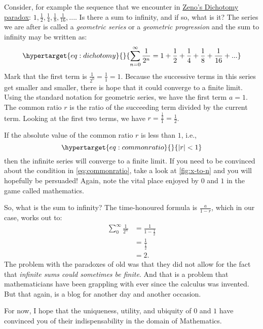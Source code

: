 \documentclass[
  a4paper,
]{article}
\begin{document}
Consider, for example the sequence that we encounter in
\href{https://en.wikipedia.org/wiki/Zeno\%27s_paradoxes}{Zeno's
Dichotomy paradox}:
\(1, \frac{1}{2}, \frac{1}{4}, \frac{1}{8}, \frac{1}{16}, ...\). Is
there a sum to infinity, and if so, what is it? The series we are after
is called a \emph{geometric series} or a \emph{geometric progression}
and the sum to infinity may be written as:
\begin{equation}\protect\hypertarget{eq:dichotomy}{}{
\sum_{n = 0}^{\infty}\frac{1}{2^{n}} = 1 + \frac{1}{2} + \frac{1}{4} + \frac{1}{8} +
\frac{1}{16} + ...
}\label{eq:dichotomy}\end{equation} Mark that the first term is
\(\frac{1}{2^0} = \frac{1}{1} = 1\). Because the successive terms in
this series get smaller and smaller, there is hope that it could
converge to a finite limit. Using the standard notation for geometric
series, we have the first term \(a = 1\). The common ratio \(r\) is the
ratio of the succeeding term divided by the current term. Looking at the
first two terms, we have \(r = \frac{\frac{1}{2}}{1} = \frac{1}{2}\).

If the absolute value of the common ratio \(r\) is less than \(1\),
i.e.,
\begin{equation}\protect\hypertarget{eq:commonratio}{}{\lvert{r}\rvert < 1
}\label{eq:commonratio}\end{equation} then the infinite series will
converge to a finite limit. If you need to be convinced about the
condition in \cref{eq:commonratio}, take a look at \cref{fig:x-to-n} and
you will hopefully be persuaded! Again, note the vital place enjoyed by
\(0\) and \(1\) in the game called mathematics.
\normalfont

So, what is the sum to infinity? The time-honoured formula is
\(\frac{a}{1-r}\), which in our case, works out to: \[
\begin{aligned}
\sum_{0}^{\infty} \frac{1}{2^n} &= \frac{1}{1-\frac{1}{2}}\\
&= \frac{1}{\frac{1}{2}}\\
&= 2.
\end{aligned}
\] The problem with the paradoxes of old was that they did not allow for
the fact that \emph{infinite sums could sometimes be finite}. And that
is a problem that mathematicians have been grappling with ever since the
calculus was invented. But that again, is a blog for another day and
another occasion.

For now, I hope that the uniqueness, utility, and ubiquity of \(0\) and
\(1\) have convinced you of their indispensability in the domain of
Mathematics.
\end{document}
